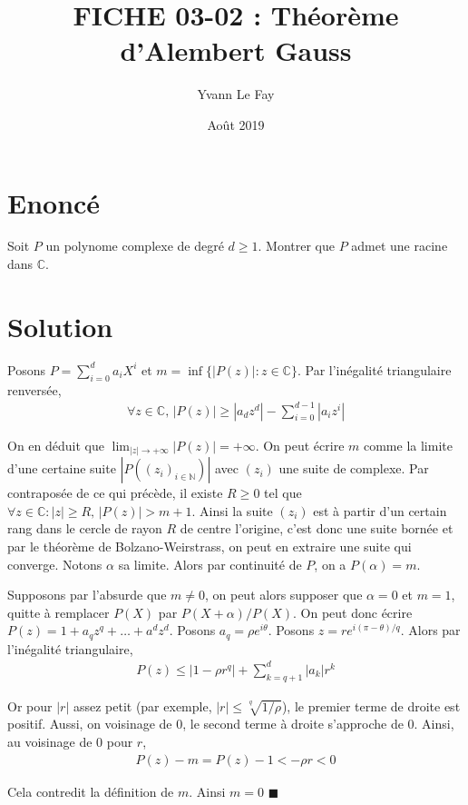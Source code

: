 \documentclass{article}
\newcommand*{\QED}{\hfill\ensuremath{\blacksquare}}%
\begin{document}
\title{FICHE 03-02 : Théorème d'Alembert Gauss}
\author{Yvann Le Fay}
\date{Août 2019}
\maketitle
\section*{Enoncé}
Soit $P$ un polynome complexe de degré $d\geq 1$. Montrer que $P$ admet une racine dans $\mathbb{C}$.
\section*{Solution}
Posons $P = \sum_{i=0}^d a_i X^i$ et $m = \inf\{|P(z)| : z\in \mathbb{C}\}$. Par l'inégalité triangulaire renversée, 
\begin{align*}
	\forall z\in \mathbb{C}, \, |P(z)| \geq |a_dz^d| - \sum_{i=0}^{d-1} |a_i z^i|
\end{align*}

On en déduit que $\lim_{|z|\to +\infty} |P(z)| = +\infty$. On peut écrire $m$ comme la limite d'une certaine suite $|P((z_i)_{i\in \mathbb{N}})|$ avec $(z_i)$ une suite de complexe. Par contraposée de ce qui précède, il existe $R\geq 0$ tel que $\forall z \in \mathbb{C} : |z|\geq R, \, |P(z)|> m+1$. Ainsi la suite $(z_i)$ est à partir d'un certain rang dans le cercle de rayon $R$ de centre l'origine, c'est donc une suite bornée et par le théorème de Bolzano-Weirstrass, on peut en extraire une suite qui converge. Notons $\alpha$ sa limite. Alors par continuité de $P$, on a $P(\alpha) = m$.

Supposons par l'absurde que $m\neq 0$, on peut alors supposer que $\alpha = 0$ et $m = 1$, quitte à remplacer $P(X)$ par $P(X+\alpha)/P(X)$. On peut donc écrire $P(z) = 1+a_qz^q+\ldots+a^d z^d$. 
Posons $a_q = \rho e^{i\theta}$. Posons $z=re^{i(\pi-\theta)/q}$. Alors par l'inégalité triangulaire,
\begin{align*}
	P(z) \leq |1-\rho r^q|+\sum_{k=q+1}^d |a_k|r^k
\end{align*}

Or pour $|r|$ assez petit (par exemple, $|r|\leq \sqrt[q]{1/\rho}$), le premier terme de droite est positif. Aussi, on voisinage de 0, le second terme à droite s'approche de 0. Ainsi, au voisinage de $0$ pour $r$, 
\begin{align*}
	P(z) - m = P(z)-1 < -\rho r < 0 
\end{align*}

Cela contredit la définition de $m$. Ainsi $m = 0$
\QED
\end{document}
